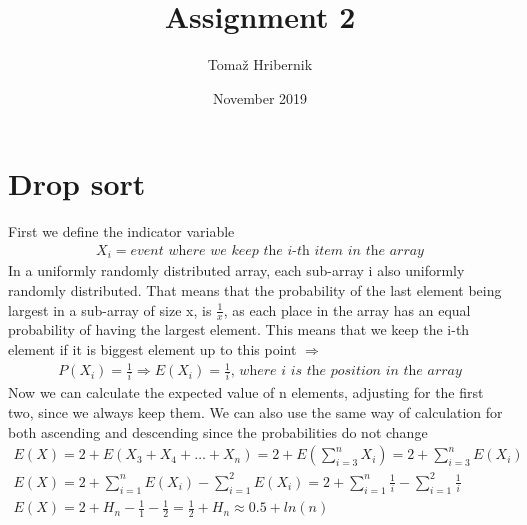 \documentclass[12pt]{article}
\title{Assignment 2}
\author{Tomaž Hribernik}
\date{November 2019}
\begin{document}
\maketitle

\section{Drop sort}
	First we define the indicator variable
	\begin{gather*}
	X_i = \textit{event where we keep the i-th item in the array}
	\end{gather*}
		In a uniformly randomly distributed array, each sub-array i also uniformly randomly distributed. That means that the probability of the last element being largest in a sub-array of size x, is $\frac{1}{x}$, as each place in the array has an equal probability of having the largest element. This means that we keep the i-th element if it is biggest element up to this point $\Rightarrow$
	\begin{gather*}
	P(X_i) = \frac{1}{i} \Rightarrow E(X_i) = \frac{1}{i} \textit{, where i is the position in the array}
	\end{gather*}
	Now we can calculate the expected value of n elements, adjusting for the first two, since we always keep them. We can also use the same way of calculation for both ascending and descending since the probabilities do not change
	\begin{gather*}
		E(X) = 2 + E(X_3 + X_4 + \dots + X_n) = 2 + E(\sum_{i=3}^{n}{X_i}) = 2 + \sum_{i=3}^{n}{E(X_i)}\\
		E(X) = 2 + \sum_{i=1}^{n}{E(X_i)} - \sum_{i=1}^{2}{E(X_i)} = 2 + \sum_{i=1}^{n}{\frac{1}{i}} - \sum_{i=1}^{2}{\frac{1}{i}}\\
		E(X) = 2 + H_n - \frac{1}{1} - \frac{1}{2} = \frac{1}{2} + H_n \approx 0.5 + ln(n)
	\end{gather*}
\end{document}
